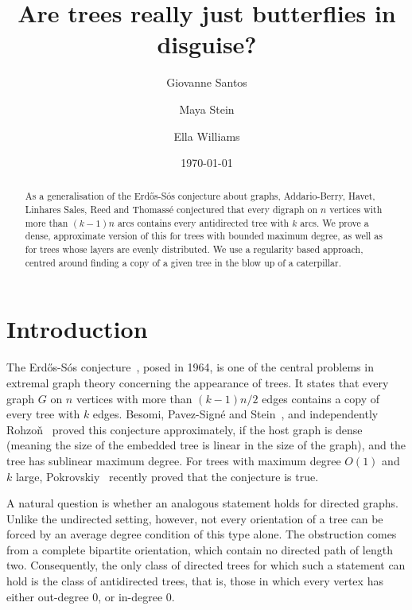 \documentclass[11pt]{article}
\title{Are trees really just butterflies in disguise?
}
\author{
Giovanne Santos\footnotemark[1]
\and
Maya Stein\footnotemark[1]
\and 
Ella Williams\footnotemark[2]
}
\date{\today}
\numberwithin{equation}{section}
\theoremstyle{definition}
\begin{document}
\maketitle

\begin{abstract}
    As a generalisation of the Erd\H{o}s-S\'os conjecture about graphs, Addario-Berry, Havet, Linhares Sales, Reed and Thomassé conjectured that every digraph on $n$ vertices with more than $(k-1)n$ arcs contains every antidirected tree with $k$ arcs. We prove a dense, approximate version of this for trees with bounded maximum degree, as well as for trees whose layers are evenly distributed. We use a regularity based approach, centred around finding a copy of a given tree in the blow up of a caterpillar.
\end{abstract}


\renewcommand{\thefootnote}{\fnsymbol{footnote}}

\section{Introduction}

The Erd\H{o}s-S\'os conjecture~\cite{Erdos63}, posed in 1964, is one of the central problems in extremal graph theory concerning the appearance of trees. It states that every graph $G$ on $n$ vertices with more than $(k-1)n/2$ edges contains a copy of every tree with $k$ edges.
Besomi, Pavez-Sign\'e and Stein~\cite{besomi2021erdHos}, and independently Rohzoň~\cite{rohzon19} proved this conjecture approximately, if the host graph is dense (meaning the size of the embedded tree is linear in the size of the graph), and the tree has sublinear maximum degree. For trees with maximum degree $O(1)$ and $k$ large, Pokrovskiy~\cite{AP_hyperstability} recently proved that the conjecture is true.

A natural question is whether an analogous statement holds for directed graphs. Unlike the undirected setting, however, not every orientation of a tree can be forced by an average degree condition of this type alone. The obstruction comes from a complete bipartite orientation, which contain no directed path of length two. Consequently, the only class of directed trees for which such a statement can hold is the class of antidirected trees, that is, those in which every vertex has either out-degree $0$, or in-degree $0$. 
\end{document}
